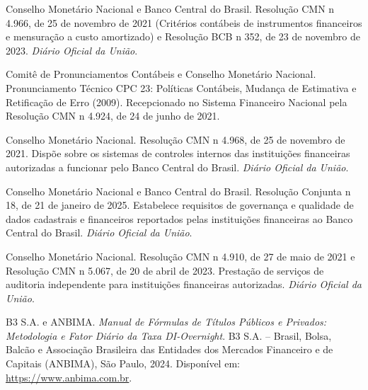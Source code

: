 \documentclass[11pt, a4paper]{article}
\theoremstyle{definition}
\theoremstyle{plain}
\theoremstyle{remark}
\begin{document}
\begin{thebibliography}{99}
Conselho Monet{\'a}rio Nacional e Banco Central do Brasil.
\newblock Resolu{\c{c}}{\~a}o CMN n{\textordmasculine} 4.966, de 25 de novembro de 2021 (Crit{\'e}rios cont{\'a}beis de instrumentos financeiros e mensura{\c{c}}{\~a}o a custo amortizado) e Resolu{\c{c}}{\~a}o BCB n{\textordmasculine} 352, de 23 de novembro de 2023. \emph{Di{\'a}rio Oficial da Uni{\~a}o}.

Comit{\^e} de Pronunciamentos Cont{\'a}beis e Conselho Monet{\'a}rio Nacional.
\newblock Pronunciamento T{\'e}cnico CPC 23: Pol{\'i}ticas Cont{\'a}beis, Mudan{\c{c}}a de Estimativa e Retifica{\c{c}}{\~a}o de Erro (2009).
\newblock Recepcionado no Sistema Financeiro Nacional pela Resolu{\c{c}}{\~a}o CMN n{\textordmasculine} 4.924, de 24 de junho de 2021.

Conselho Monet{\'a}rio Nacional.
\newblock Resolu{\c{c}}{\~a}o CMN n{\textordmasculine} 4.968, de 25 de novembro de 2021. Disp{\~o}e sobre os sistemas de controles internos das institui{\c{c}}{\~o}es financeiras autorizadas a funcionar pelo Banco Central do Brasil. \emph{Di{\'a}rio Oficial da Uni{\~a}o}.

Conselho Monet{\'a}rio Nacional e Banco Central do Brasil.
\newblock Resolu{\c{c}}{\~a}o Conjunta n{\textordmasculine} 18, de 21 de janeiro de 2025. Estabelece requisitos de governan{\c{c}}a e qualidade de dados cadastrais e financeiros reportados pelas institui{\c{c}}{\~o}es financeiras ao Banco Central do Brasil. \emph{Di{\'a}rio Oficial da Uni{\~a}o}.

Conselho Monet{\'a}rio Nacional.
\newblock Resolu{\c{c}}{\~a}o CMN n{\textordmasculine} 4.910, de 27 de maio de 2021 e Resolu{\c{c}}{\~a}o CMN n{\textordmasculine} 5.067, de 20 de abril de 2023. Presta{\c{c}}{\~a}o de servi{\c{c}}os de auditoria independente para institui{\c{c}}{\~o}es financeiras autorizadas. \emph{Di{\'a}rio Oficial da Uni{\~a}o}.

B3 S.A. e ANBIMA.
\newblock \emph{Manual de F{\'o}rmulas de T{\'i}tulos P{\'u}blicos e Privados: Metodologia e Fator Di{\'a}rio da Taxa DI-Overnight}.
\newblock B3 S.A. -- Brasil, Bolsa, Balc{\~a}o e Associa{\c{c}}{\~a}o Brasileira das Entidades dos Mercados Financeiro e de Capitais (ANBIMA), S{\~a}o Paulo, 2024.
\newblock Dispon{\'i}vel em: \url{https://www.anbima.com.br}.

\end{thebibliography}
\end{document}
